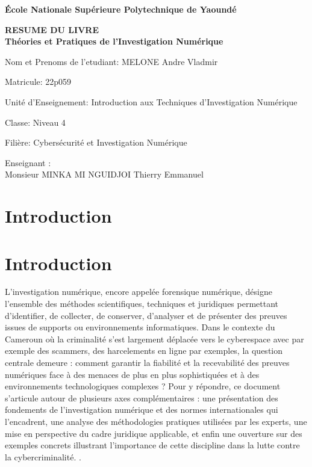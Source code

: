 \documentclass[12pt]{article}
\begin{document}
\begin{titlepage}
    \centering
    \vspace*{1cm}
    {\Huge\bfseries École Nationale Supérieure Polytechnique de Yaoundé \par}
    \vspace{1.5cm}
    {\Huge\bfseries RESUME DU LIVRE  \\ Théories et Pratiques de l'Investigation Numérique \par}
    \vspace{1.5cm}
    {\Large Nom et Prenoms de l'etudiant: MELONE Andre Vladmir \par}
    \vspace{0.5cm}
    {\large Matricule: 22p059 \par}
    \vspace{0.5cm}
    {\large Unité d'Enseignement: Introduction aux Techniques d'Investigation Numérique \par}
    \vspace{0.5cm}
    {\large Classe: Niveau 4 \par}
    \vspace{0.5cm}
    {\large Filière: Cybersécurité et Investigation Numérique \par}
    \vspace{2cm}
    {\large Enseignant : \\ Monsieur MINKA MI NGUIDJOI Thierry Emmanuel \par}
    \vspace{1cm}

\end{titlepage}


\newpage

\section{Introduction}


\section*{Introduction}

L’investigation numérique, encore appelée forensique numérique, désigne l’ensemble des méthodes scientifiques, techniques et juridiques permettant d’identifier, de collecter, de conserver, d’analyser et de présenter des preuves issues de supports ou environnements informatiques. Dans le contexte du Cameroun où la criminalité s’est largement déplacée vers le cyberespace avec par exemple des scammers, des harcelements en ligne par exemples, la question centrale demeure : comment garantir la fiabilité et la recevabilité des preuves numériques face à des menaces de plus en plus sophistiquées et à des environnements technologiques complexes ? Pour y répondre, ce document s’articule autour de plusieurs axes complémentaires : une présentation des fondements de l’investigation numérique et des normes internationales qui l’encadrent, une analyse des méthodologies pratiques utilisées par les experts, une mise en perspective du cadre juridique applicable, et enfin une ouverture sur des exemples concrets illustrant l’importance de cette discipline dans la lutte contre la cybercriminalité.
.
\end{document}

